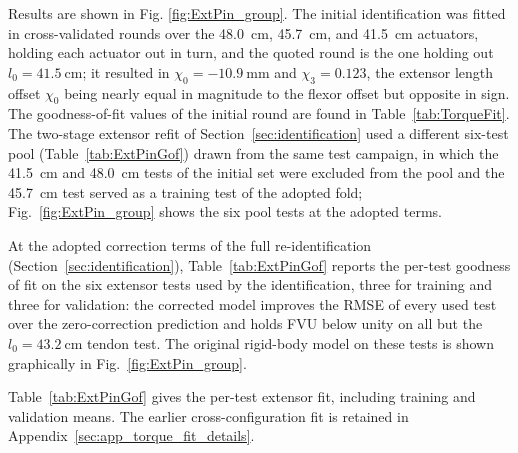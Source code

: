 Results are shown in Fig. \ref{fig:ExtPin_group}. The initial identification was fitted in cross-validated rounds over the \qty{48.0}{\cm}, \qty{45.7}{\cm}, and \qty{41.5}{\cm} actuators, holding each actuator out in turn, and the quoted round is the one holding out $l_{0}=\qty{41.5}{\cm}$; it resulted in $\chi_{0} = \qty{-10.9}{\mm}$ and $\chi_{3} = 0.123$, the extensor length offset $\chi_{0}$ being nearly equal in magnitude to the flexor offset but opposite in sign. The goodness-of-fit values of the initial round are found in Table~\ref{tab:TorqueFit}. The two-stage extensor refit of Section~\ref{sec:identification} used a different six-test pool (Table~\ref{tab:ExtPinGof}) drawn from the same test campaign, in which the \qty{41.5}{\cm} and \qty{48.0}{\cm} tests of the initial set were excluded from the pool and the \qty{45.7}{\cm} test served as a training test of the adopted fold; Fig.~\ref{fig:ExtPin_group} shows the six pool tests at the adopted terms.

At the adopted correction terms of the full re-identification (Section~\ref{sec:identification}), Table~\ref{tab:ExtPinGof} reports the per-test goodness of fit on the six extensor tests used by the identification, three for training and three for validation: the corrected model improves the RMSE of every used test over the zero-correction prediction and holds FVU below unity on all but the $l_{0}=\qty{43.2}{\cm}$ tendon test. The original rigid-body model on these tests is shown graphically in Fig.~\ref{fig:ExtPin_group}.

Table~\ref{tab:ExtPinGof} gives the per-test extensor fit, including training and validation means. The earlier cross-configuration fit is retained in Appendix~\ref{sec:app_torque_fit_details}.


